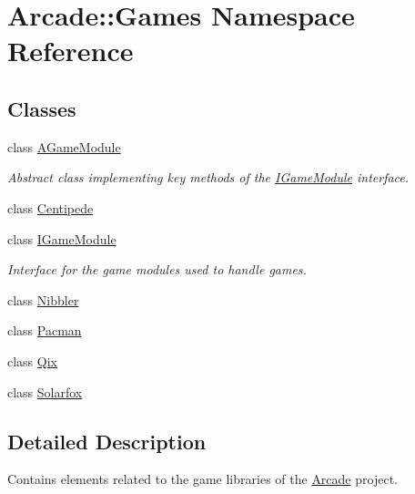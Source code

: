 \hypertarget{namespaceArcade_1_1Games}{}\section{Arcade\+::Games Namespace Reference}
\label{namespaceArcade_1_1Games}
\subsection*{Classes}
\begin{DoxyCompactItemize}
\item 
class \mbox{\hyperlink{classArcade_1_1Games_1_1AGameModule}{A\+Game\+Module}}
\begin{DoxyCompactList}\small\item\em Abstract class implementing key methods of the \mbox{\hyperlink{classArcade_1_1Games_1_1IGameModule}{I\+Game\+Module}} interface. \end{DoxyCompactList}\item 
class \mbox{\hyperlink{classArcade_1_1Games_1_1Centipede}{Centipede}}
\item 
class \mbox{\hyperlink{classArcade_1_1Games_1_1IGameModule}{I\+Game\+Module}}
\begin{DoxyCompactList}\small\item\em Interface for the game modules used to handle games. \end{DoxyCompactList}\item 
class \mbox{\hyperlink{classArcade_1_1Games_1_1Nibbler}{Nibbler}}
\item 
class \mbox{\hyperlink{classArcade_1_1Games_1_1Pacman}{Pacman}}
\item 
class \mbox{\hyperlink{classArcade_1_1Games_1_1Qix}{Qix}}
\item 
class \mbox{\hyperlink{classArcade_1_1Games_1_1Solarfox}{Solarfox}}
\end{DoxyCompactItemize}


\subsection{Detailed Description}
Contains elements related to the game libraries of the \mbox{\hyperlink{namespaceArcade}{Arcade}} project. 